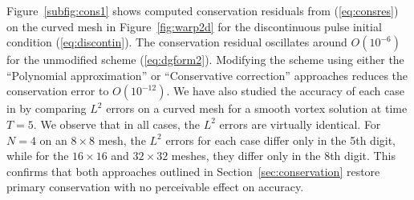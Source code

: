 \documentclass[10pt]{amsart}
\theoremstyle{definition}
\theoremstyle{lemma}
\theoremstyle{theorem}
\theoremstyle{assumption}
\newcommand{\note}[1]{{\color{blue}{#1}}}
\begin{document}
{Figure~\ref{subfig:cons1} shows computed conservation residuals from (\ref{eq:consres}) on the curved mesh in Figure~\ref{fig:warp2d} for the discontinuous pulse initial condition (\ref{eq:discontin}).  The conservation residual oscillates around $O(10^{-6})$ for the unmodified scheme (\ref{eq:dgform2}).  Modifying the scheme using either the ``Polynomial approximation'' or ``Conservative correction'' approaches reduces the conservation error to $O(10^{-12})$.  %
We have also studied the accuracy of each case in by comparing $L^2$ errors on a curved mesh for a smooth vortex solution  at time $T=5$.  We observe that in all cases, the $L^2$ errors are virtually identical.  For $N=4$ on an $8\times 8$ mesh, the $L^2$ errors for each case differ only in the 5th digit, while for the $16\times 16$ and $32\times 32$ meshes, they differ only in the 8th digit.  This confirms that both approaches outlined in Section~\ref{sec:conservation} restore primary conservation with no perceivable effect on accuracy.  


\begin{figure}
\centering
{}
\end{figure}}
\end{document}
